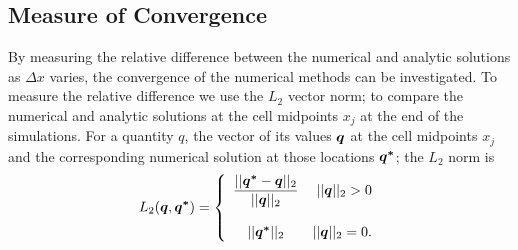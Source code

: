 \subsection{Measure of Convergence}
By measuring the relative difference between the numerical and analytic solutions as $\Delta x$ varies, the convergence of the numerical methods can be investigated. To measure the relative difference we use the $L_2$ vector norm; to compare the numerical and analytic solutions at the cell midpoints $x_j$ at the end of the simulations. For a quantity $q$, the vector of its values $\boldsymbol{q}$ at the cell midpoints $x_j$ and the corresponding numerical solution at those locations $\boldsymbol{q^*}$; the $L_2$ norm is
\begin{equation*}
L_2(\boldsymbol{q},\boldsymbol{q^*}) =  \left\lbrace \begin{array}{c r} 
\dfrac{||\boldsymbol{q^*} - \boldsymbol{q}||_{2}}{||\boldsymbol{q}||_{2}} & ||\boldsymbol{q}||_{2} > 0 \\ \\
{||\boldsymbol{q^*}||_{2}} & ||\boldsymbol{q}||_{2} = 0 . \end{array}\right. 
\label{eqn:L1qdef} 
\end{equation*}




